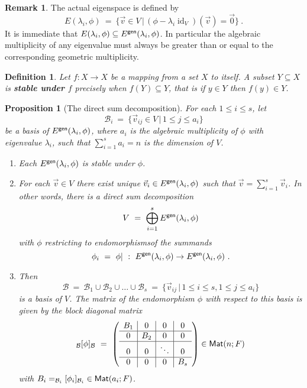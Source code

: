 \documentclass[11pt]{amsbook}
\DeclareMathOperator{\id}{\mathrm{id}}
\newtheorem{definition}[theorem]{Definition}
\newtheorem{proposition}[theorem]{Proposition}
\theoremstyle{definition}
\newtheorem{rem}[theorem]{Remark}
\begin{document}
\begin{rem} The actual eigenspace is defined by
$$E(\lambda_i , \phi)~ =~ \{ \vec{v}\in V\,\vert\,  (\phi-\lambda_i \id_V) (\vec{v}) = \vec{0}\}~.$$ 
It is immediate that $E(\lambda_i, \phi)\subseteq E^{\sf gen}(\lambda_i, \phi)$. In particular the algebraic multiplicity of any eigenvalue must always be greater than or equal to the corresponding geometric multiplicity.
\end{rem}

\begin{definition} Let $f:X \to X$ be a mapping from a set $X$ to itself. A subset $Y\subseteq X$ is {\bf stable under $f$} precisely when $f(Y) \subseteq Y$, that is if $y \in Y$ then $f(y) \in Y$. 
\end{definition}

\begin{proposition}[The direct sum decomposition] \label{dirsumdec} For each $1\leqslant i \leqslant s$, let 
$${\mathcal B}_i~=~\{ \vec{v}_{ij} \in V \,\vert\, 1\leqslant j \leqslant a_i \}$$
 be a basis of $E^{\sf gen}(\lambda_i, \phi)$, where $a_i$ is the algebraic multiplicity of $\phi$ with eigenvalue $\lambda_i$, such that
 $\sum\limits^s_{i=1}a_i=n$ is the dimension of $V$.
\begin{enumerate}
\item Each $E^{\sf gen}(\lambda_i , \phi)$ is stable under $\phi$.
\item For each $\vec{v} \in V$ there exist unique $\vec{v}_i \in E^{\sf gen}(\lambda_i , \phi)$ such that $\vec{v} = \sum_{i=1}^s \vec{v}_i$.  In other words, there is a direct sum decomposition 
$$V~ =~ \bigoplus_{i=1}^s E^{\sf gen}(\lambda_i, \phi)$$
with $\phi$ restricting to endomorphismsof the summands
$$\phi_i~=~\phi\vert~:~E^{\sf gen}(\lambda_i, \phi)\to E^{\sf gen}(\lambda_i, \phi)~.$$
\item Then 
$$\mathcal{B} ~=~{\mathcal B}_1 \cup {\mathcal B}_2 \cup \dots 
\cup {\mathcal B}_s~=~ \{\vec{v}_{ij}\,\vert\, 1\leqslant i \leqslant s, 1\leqslant j\leqslant a_i\}$$ 
is a basis of $V$. The matrix of the endomorphism $\phi$ with respect to this basis is given by the block diagonal matrix 
$$_{\mathcal B}[\phi]_{\mathcal B}~=~\left(\begin{array}{c | c | c | c}
B_1 & 0 & 0 & 0 \\ \hline
0 & B_2 & 0& 0 \\ \hline 0 & 0 & \ddots & 0 \\ \hline 0 & 0 & 0 & B_s
\end{array}\right) \in {\sf Mat}(n;F)$$ 
with $B_i=_{{\mathcal B}_i}[\phi_i]_{{\mathcal B}_i} \in {\sf Mat}(a_i; F)$.
\end{enumerate}
\end{proposition}
\end{document}
